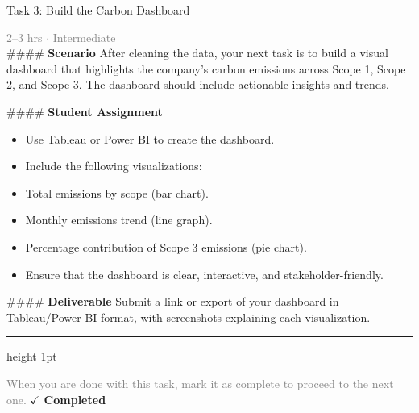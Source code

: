 \documentclass[10pt,a4paper]{article}
\begin{document}
\begin{taskbox}{Task 3: Build the Carbon Dashboard}

    {\small \textcolor{gray}{2--3 hrs $\cdot$ Intermediate}}\\[12pt]

    \#\#\#\# \textbf{Scenario}  
After cleaning the data, your next task is to build a visual dashboard that highlights the company’s carbon emissions across Scope 1, Scope 2, and Scope 3. The dashboard should include actionable insights and trends.

\#\#\#\# \textbf{Student Assignment}
\begin{itemize}
    \item Use Tableau or Power BI to create the dashboard.  
    \item Include the following visualizations:  
    \item Total emissions by scope (bar chart).  
    \item Monthly emissions trend (line graph).  
    \item Percentage contribution of Scope 3 emissions (pie chart).  
    \item Ensure that the dashboard is clear, interactive, and stakeholder-friendly.
\end{itemize}

\#\#\#\# \textbf{Deliverable}
Submit a link or export of your dashboard in Tableau/Power BI format, with screenshots explaining each visualization.\par

    \vspace{16pt}

    \textcolor{cardBorder}{\hrule height 1pt}\vspace{8pt}

    \small \textcolor{gray}{When you are done with this task, mark it as complete to proceed to the next one.} \hfill \textbf{\textcolor{brandDark}{$\checkmark$ Completed}}

\end{taskbox}
\end{document}

